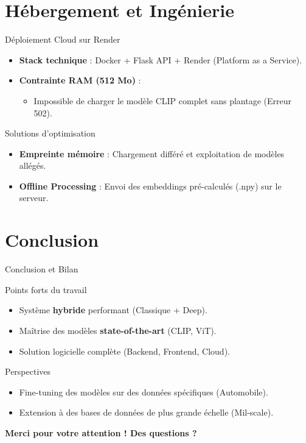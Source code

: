 \documentclass[aspectratio=169]{beamer}
\begin{document}
\section{Hébergement et Ingénierie}

\begin{frame}{Déploiement Cloud sur Render}
    \begin{itemize}
        \item \textbf{Stack technique} : Docker + Flask API + Render (Platform as a Service).
        \item \textbf{Contrainte RAM (512 Mo)} :
        \begin{itemize}
            \item Impossible de charger le modèle CLIP complet sans plantage (Erreur 502).
        \end{itemize}
    \end{itemize}
    \begin{block}{Solutions d'optimisation}
        \begin{itemize}
            \item \textbf{Empreinte mémoire} : Chargement différé et exploitation de modèles allégés.
            \item \textbf{Offline Processing} : Envoi des embeddings pré-calculés (.npy) sur le serveur.
        \end{itemize}
    \end{block}
\end{frame}

\section{Conclusion}

\begin{frame}{Conclusion et Bilan}
    \begin{block}{Points forts du travail}
        \begin{itemize}
            \item Système \textbf{hybride} performant (Classique + Deep).
            \item Maîtrise des modèles \textbf{state-of-the-art} (CLIP, ViT).
            \item Solution logicielle complète (Backend, Frontend, Cloud).
        \end{itemize}
    \end{block}
    
    \begin{block}{Perspectives}
        \begin{itemize}
            \item Fine-tuning des modèles sur des données spécifiques (Automobile).
            \item Extension à des bases de données de plus grande échelle (Mil-scale).
        \end{itemize}
    \end{block}
    \centering \vfill \textbf{Merci pour votre attention ! Des questions ?}
\end{frame}
\end{document}
